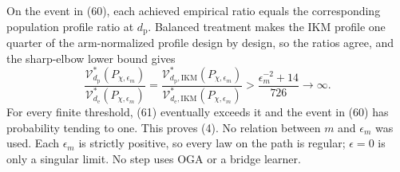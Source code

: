 On the event in (60), each achieved empirical ratio equals the corresponding population profile ratio at \(d_{\mathrm p}\).  Balanced treatment makes the IKM profile one quarter of the arm-normalized profile design by design, so the ratios agree, and the sharp-elbow lower bound gives
\[
 \frac{\mathcal V_{d_{\mathrm p}}^*(P_{\chi,\epsilon_m})}
 {\mathcal V_{d_{\mathrm e}}^*(P_{\chi,\epsilon_m})}
 =\frac{\mathcal V_{d_{\mathrm p},\mathrm{IKM}}^*(P_{\chi,\epsilon_m})}
 {\mathcal V_{d_{\mathrm e},\mathrm{IKM}}^*(P_{\chi,\epsilon_m})}
 >\frac{\epsilon_m^{-2}+14}{726}\longrightarrow\infty.  \tag{61}
\]
For every finite threshold, (61) eventually exceeds it and the event in (60) has probability tending to one.  This proves (4).  No relation between \(m\) and \(\epsilon_m\) was used.  Each \(\epsilon_m\) is strictly positive, so every law on the path is regular; \(\epsilon=0\) is only a singular limit.  No step uses OGA or a bridge learner.
